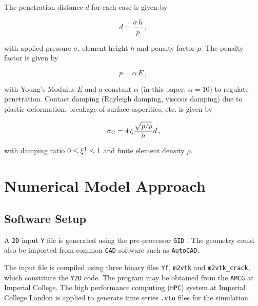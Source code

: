 \documentclass[format=acmtog,12pt,screen=true,review=false,natbib=false,]{acmart}
\begin{document}
\bigbreak
The penetration distance $d$ for each case is given by \cite{Mun04}

\begin{equation}
    \label{eq:d}
    d=\frac{\sigma\,h}{p}\,,
\end{equation}

with applied pressure $\sigma$, element height $h$ and penalty factor $p$. The penalty factor is given by

\begin{equation}
    \label{eq:p}
    p=\alpha\,E\,,
\end{equation}

with \rm{Young's Modulus} $E$ and a constant $\alpha$ (in this paper: $\alpha=10$) to regulate penetration. Contact damping (Rayleigh damping, viscous damping) due to plastic deformation, breakage of surface asperities, etc. is given by \cite{Mun04}

\begin{equation}
    \label{eq:sigmac}
    \sigma_{\rm{C}}=4\,\xi\frac{\sqrt{p/\rho}}{h}\dot{d}\,,
\end{equation}

\addtocounter{footnote}{-1}
with damping ratio $0\leq\xi\footnotemark\leq1$ and finite element density $\rho$.  


\section{Numerical Model Approach}
\label{sec:NumericalModelApproach}

\subsection{Software Setup}
\label{subsec:SoftwareSetup}

A \texttt{2D} input \texttt{Y} file is generated using the pre-processor \texttt{GID} \cite{GID11}. The geometry could also be imported from common \texttt{CAD} software such as \texttt{AutoCAD}.

\bigbreak
The input file is compiled using three binary files \texttt{Yf}, \texttt{m2vtk} and \texttt{m2vtk\_crack}, which constitute the \texttt{Y2D} code. The program may be obtained from the \texttt{AMCG} at Imperial College. The high performance computing (\texttt{HPC}) system at Imperial College London is applied to generate time series \texttt{.vtu} files for the simulation. 
\end{document}
